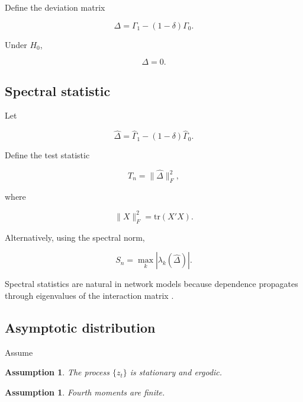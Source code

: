 \documentclass[12pt]{article}
\numberwithin{equation}{section}
\newtheorem{assumption}[theorem]{Assumption}
\begin{document}
Define the deviation matrix

\begin{equation}
\Delta
=
\Gamma_1
-
(1-\delta)\Gamma_0.
\label{eq:7.delta}
\end{equation}

Under $H_0$,

\begin{equation}
\Delta = 0.
\label{eq:7.delta0}
\end{equation}

\subsection{Spectral statistic}

Let

\begin{equation}
\hat \Delta
=
\hat \Gamma_1
-
(1-\delta)\hat \Gamma_0.
\label{eq:7.deltahat}
\end{equation}

Define the test statistic

\begin{equation}
T_n
=
\|
\hat \Delta
\|_F^2,
\label{eq:7.stat}
\end{equation}

where

\begin{equation}
\|X\|_F^2
=
\mathrm{tr}(X'X).
\label{eq:7.fro}
\end{equation}

Alternatively, using the spectral norm,

\begin{equation}
S_n
=
\max_k
|\lambda_k(\hat \Delta)|.
\label{eq:7.spec}
\end{equation}

Spectral statistics are natural in network models because dependence
propagates through eigenvalues of the interaction matrix
\citep{acemoglu2012network, elliott2014financial}.

\subsection{Asymptotic distribution}

Assume

\begin{assumption}
The process $\{z_t\}$ is stationary and ergodic.
\end{assumption}

\begin{assumption}
Fourth moments are finite.
\end{assumption}
\end{document}
